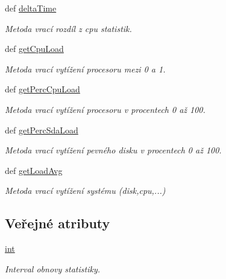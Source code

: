 \begin{DoxyCompactItemize}
def \hyperlink{classSysLoad_1_1SysLoad_abaf98f579871142a2bca31ee312b55b5}{delta\-Time}
\begin{DoxyCompactList}\small\item\em Metoda vrací rozdíl z cpu statistik. \end{DoxyCompactList}\item 
def \hyperlink{classSysLoad_1_1SysLoad_a0e61f72ce5be5549a61836ae78352462}{get\-Cpu\-Load}
\begin{DoxyCompactList}\small\item\em Metoda vrací vytížení procesoru mezi 0 a 1. \end{DoxyCompactList}\item 
def \hyperlink{classSysLoad_1_1SysLoad_a850f2f2f4bff009a9fe24faffbebe3ca}{get\-Perc\-Cpu\-Load}
\begin{DoxyCompactList}\small\item\em Metoda vrací vytížení procesoru v procentech 0 až 100. \end{DoxyCompactList}\item 
def \hyperlink{classSysLoad_1_1SysLoad_a9464f6f2f01a89169aa36d818f1af51c}{get\-Perc\-Sda\-Load}
\begin{DoxyCompactList}\small\item\em Metoda vrací vytížení pevného disku v procentech 0 až 100. \end{DoxyCompactList}\item 
def \hyperlink{classSysLoad_1_1SysLoad_ab21272b6a351f0a904b2cd39ac3df38a}{get\-Load\-Avg}
\begin{DoxyCompactList}\small\item\em Metoda vrací vytížení systému (disk,cpu,...) \end{DoxyCompactList}\end{DoxyCompactItemize}
\subsection*{Veřejné atributy}
\begin{DoxyCompactItemize}
\item 
\hypertarget{classSysLoad_1_1SysLoad_ac2f7c48ad5c162afa0efeca1024566f1}{\hyperlink{classSysLoad_1_1SysLoad_ac2f7c48ad5c162afa0efeca1024566f1}{int}}\label{d0/d3a/classSysLoad_1_1SysLoad_ac2f7c48ad5c162afa0efeca1024566f1}

\begin{DoxyCompactList}\small\item\em Interval obnovy statistiky. \end{DoxyCompactList}\end{DoxyCompactItemize}


